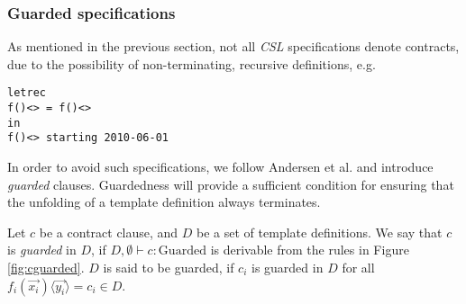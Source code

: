 \documentclass[orivec,final]{llncs-href}
\newcommand{\csl}{\textit{CSL}}
\newcommand{\cinstantiate}[3]{#1(#2)\langle#3\rangle}
\begin{document}
\subsubsection{Guarded specifications}\label{sec:guarded}
\newcommand{\guarded}{\mathrm{Guarded}}
\newcommand{\cguarded}[3]{#1, #2 \vdash #3 : \guarded}
As mentioned in the previous section, not all \csl{} specifications
denote contracts, due to the possibility of non-terminating,
recursive definitions, e.g.
\begin{lstlisting}[language=csl]
letrec
f()<> = f()<>
in
f()<> starting 2010-06-01
\end{lstlisting}

In order to avoid such specifications, we follow Andersen et
al. \cite{andersen06contracts} and introduce \emph{guarded}
clauses. Guardedness will provide a sufficient condition for ensuring
that the unfolding of a template definition always terminates.
\begin{definition}
Let $c$ be a contract clause, and $D$ be a set of template
definitions. We say that $c$ is \emph{guarded} in $D$, if
$\cguarded{D}{\emptyset}{c}$ is 
derivable from the rules in Figure \ref{fig:cguarded}. $D$ is said to
be guarded, if $c_i$ is guarded in $D$ for all
$\cinstantiate{f_i}{\vec{x_i}}{\vec{y_i}} = c_i \in D$.
\end{definition}
\end{document}
